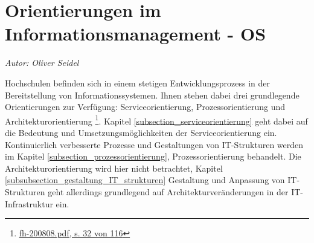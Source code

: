 \section{Orientierungen im Informationsmanagement - OS}
\textit{Autor: Oliver Seidel}

Hochschulen befinden sich in einem stetigen Entwicklungsprozess in der Bereitstellung von Informationssystemen. Ihnen stehen dabei drei grundlegende Orientierungen zur Verfügung: Serviceorientierung, Prozessorientierung und Architekturorientierung \footnote{\url{fh-200808.pdf, s. 32 von 116}}. Kapitel \ref{subsection_serviceorientierung} geht dabei auf die Bedeutung und Umsetzungsmöglichkeiten der Serviceorientierung ein. Kontinuierlich verbesserte Prozesse und Gestaltungen von IT-Strukturen werden im Kapitel \ref{subsection_prozessorientierung}, Prozessorientierung behandelt. Die Architekturorientierung wird hier nicht betrachtet, Kapitel \ref{subsubsection_gestaltung_IT_strukturen} Gestaltung und Anpassung von IT-Strukturen geht allerdings grundlegend auf Architekturveränderungen in der IT-Infrastruktur ein.

